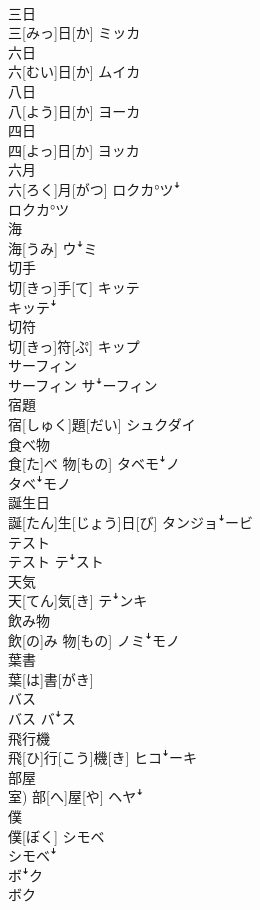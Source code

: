 \documentclass[8pt]{extreport}
\begin{document}
\begin{CJK}{UTF8}{min}
\\	三日	
\\	三[みっ]日[か]	ミッカ
\\	六日	
\\	六[むい]日[か]	ムイカ
\\	八日	
\\	八[よう]日[か]	ヨーカ
\\	四日	
\\	四[よっ]日[か]	ヨッカ
\\	六月	
\\	六[ろく]月[がつ]	ロクカ°ツꜜ 
\\	ロクカ°ツ
\\	海	
\\	海[うみ]	ウꜜミ
\\	切手	
\\	切[きっ]手[て]	キッテ 
\\	キッテꜜ
\\	切符	
\\	切[きっ]符[ぷ]	キップ
\\	サーフィン	
\\	サーフィン	サꜜーフィン
\\	宿題	
\\	宿[しゅく]題[だい]	シュクダイ
\\	食べ物	
\\	食[た]べ 物[もの]	タベモꜜノ 
\\	タベꜜモノ
\\	誕生日	
\\	誕[たん]生[じょう]日[び]	タンジョꜜービ
\\	テスト	
\\	テスト	テꜜスト
\\	天気	
\\	天[てん]気[き]	テꜜンキ
\\	飲み物	
\\	飲[の]み 物[もの]	ノミꜜモノ
\\	葉書	
\\	葉[は]書[がき]	
\\	バス	
\\	バス	バꜜス
\\	飛行機	
\\	飛[ひ]行[こう]機[き]	ヒコꜜーキ
\\	部屋	
\\	室)	部[へ]屋[や]	ヘヤꜜ
\\	僕	
\\	僕[ぼく]	シモベ 
\\	シモベꜜ 
\\	ボꜜク 
\\	ボク

\end{CJK}
\end{document}

